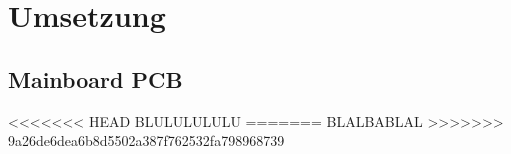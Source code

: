 \newpage
\section{Umsetzung}
\subsection{Mainboard PCB}

<<<<<<< HEAD
BLULULULULU
=======
BLALBABLAL
>>>>>>> 9a26de6dea6b8d5502a387f762532fa798968739
